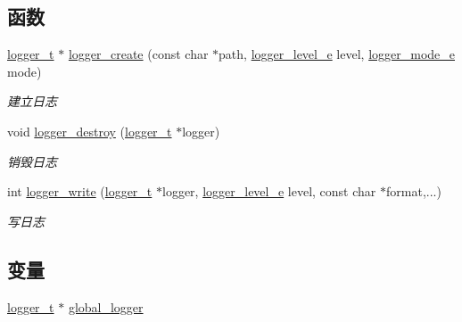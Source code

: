 \subsection*{函数}
\begin{DoxyCompactItemize}
\item 
\hyperlink{a00050_a0468bf19eb27c2a3035789901b262671_a0468bf19eb27c2a3035789901b262671}{logger\+\_\+t} $\ast$ \hyperlink{a00067_a99170db05ea3c90f8799e90d23032562_a99170db05ea3c90f8799e90d23032562}{logger\+\_\+create} (const char $\ast$path, \hyperlink{a00050_afe883c56a5fd8d7794a3dd36780ed9d0_afe883c56a5fd8d7794a3dd36780ed9d0}{logger\+\_\+level\+\_\+e} level, \hyperlink{a00050_aa72cd8c306f50bee7c64e1daa1c1f3f4_aa72cd8c306f50bee7c64e1daa1c1f3f4}{logger\+\_\+mode\+\_\+e} mode)
\begin{DoxyCompactList}\small\item\em 建立日志 \end{DoxyCompactList}\item 
void \hyperlink{a00067_a45bc781df24f677451bcc079de530585_a45bc781df24f677451bcc079de530585}{logger\+\_\+destroy} (\hyperlink{a00050_a0468bf19eb27c2a3035789901b262671_a0468bf19eb27c2a3035789901b262671}{logger\+\_\+t} $\ast$logger)
\begin{DoxyCompactList}\small\item\em 销毁日志 \end{DoxyCompactList}\item 
int \hyperlink{a00067_aad3695a5b5df8331b3c0f3e069f037f5_aad3695a5b5df8331b3c0f3e069f037f5}{logger\+\_\+write} (\hyperlink{a00050_a0468bf19eb27c2a3035789901b262671_a0468bf19eb27c2a3035789901b262671}{logger\+\_\+t} $\ast$logger, \hyperlink{a00050_afe883c56a5fd8d7794a3dd36780ed9d0_afe883c56a5fd8d7794a3dd36780ed9d0}{logger\+\_\+level\+\_\+e} level, const char $\ast$format,...)
\begin{DoxyCompactList}\small\item\em 写日志 \end{DoxyCompactList}\end{DoxyCompactItemize}
\subsection*{变量}
\begin{DoxyCompactItemize}
\item 
\hyperlink{a00050_a0468bf19eb27c2a3035789901b262671_a0468bf19eb27c2a3035789901b262671}{logger\+\_\+t} $\ast$ \hyperlink{a00067_a390c05c7cb68b8334d6418733f330945_a390c05c7cb68b8334d6418733f330945}{global\+\_\+logger}
\end{DoxyCompactItemize}


